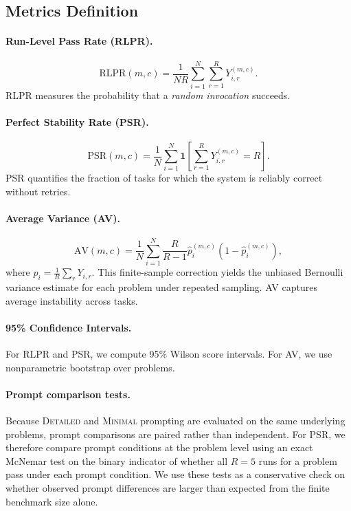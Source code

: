 \documentclass[11pt]{article}
\begin{document}
\subsection{Metrics Definition}

\paragraph{Run-Level Pass Rate (RLPR).}
$$
\mathrm{RLPR}(m,c)=\frac{1}{NR}\sum_{i=1}^{N}\sum_{r=1}^{R} Y_{i,r}^{(m,c)}.
$$
RLPR measures the probability that a \emph{random invocation} succeeds.

\paragraph{Perfect Stability Rate (PSR).}
$$
\mathrm{PSR}(m,c)=\frac{1}{N}\sum_{i=1}^{N} \mathbf{1}\!\left[\sum_{r=1}^{R} Y_{i,r}^{(m,c)}=R\right].
$$
PSR quantifies the fraction of tasks for which the system is reliably correct without retries.

\paragraph{Average Variance (AV).}
$$
\mathrm{AV}(m,c)=\frac{1}{N}\sum_{i=1}^{N} \frac{R}{R-1}\hat{p}_i^{(m,c)}\!\left(1-\hat{p}_i^{(m,c)}\right),
$$
where $\hat{p}_i = \frac{1}{R}\sum_r Y_{i,r}$. This finite-sample correction yields the unbiased Bernoulli variance estimate for each problem under repeated sampling. AV captures average instability across tasks.

\paragraph{95\% Confidence Intervals.}
For RLPR and PSR, we compute 95\% Wilson score intervals. For AV, we use nonparametric bootstrap over problems.

\paragraph{Prompt comparison tests.}
Because \textsc{Detailed} and \textsc{Minimal} prompting are evaluated on the same underlying problems, prompt comparisons are paired rather than independent. For PSR, we therefore compare prompt conditions at the problem level using an exact McNemar test on the binary indicator of whether all $R=5$ runs for a problem pass under each prompt condition. We use these tests as a conservative check on whether observed prompt differences are larger than expected from the finite benchmark size alone.
\end{document}
